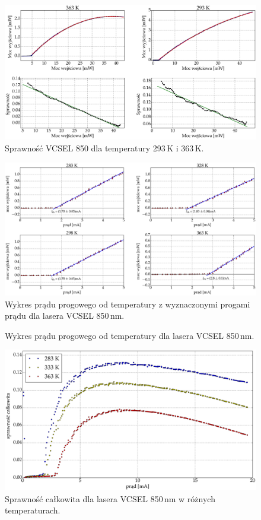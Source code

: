 \begin{figure}
\center
  \includegraphics[scale=0.30]{plot_vcsel_850/plot_eff_20_90_via_power.eps}
  \caption{Sprawność VCSEL 850 dla temperatury 293\,K i 363\,K.}
  \label{vcsel_850_rys_5}
\end{figure}
\begin{figure}
\center
  \includegraphics[scale=0.30]{plot_vcsel_850/plot_fit_i_th.eps}
  \caption{Wykres prądu progowego od temperatury z wyznaczonymi progami prądu dla lasera VCSEL 850\,nm.}
  \label{vcsel_850_rys_6}
\end{figure}
\begin{figure}
\center
  
  \caption{Wykres prądu progowego od temperatury dla lasera VCSEL 850\,nm.}
  \label{vcsel_850_rys_7}
\end{figure}
\begin{figure}
\center
  \includegraphics[scale=0.30]{plot_vcsel_850/plot_eff_wall.eps}
  \caption{Sprawność całkowita dla lasera VCSEL 850\,nm w różnych temperaturach.}
  \label{vcsel_850_rys_8}
\end{figure}
